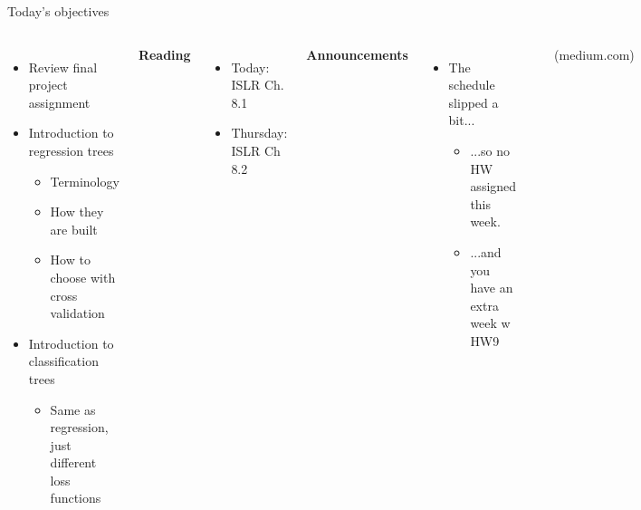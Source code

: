 \documentclass[mathserif, aspectratio=169]{beamer}
\begin{document}
\begin{frame}{Today's objectives}


\begin{columns}
\begin{itemize}
\item Review final project assignment
\item Introduction to regression trees
\begin{itemize}
\item Terminology
\item How they are built
\item How to choose with cross validation
\end{itemize}
\item Introduction to classification trees
\begin{itemize}
\item Same as regression, just different loss functions
\end{itemize}
\end{itemize}

\textbf{Reading}
\begin{itemize}
\item Today: ISLR Ch. 8.1
\item Thursday: ISLR Ch 8.2
\end{itemize}

\textbf{Announcements}
\begin{itemize}
\item The schedule slipped a bit...
\begin{itemize}
\item ...so no HW assigned this week.
\item ...and you have an extra week w HW9
\end{itemize}
\end{itemize}
\includegraphics[width=\textwidth]{RTree_image}

{\tiny (medium.com)}
\end{columns}


\end{frame}
\end{document}
